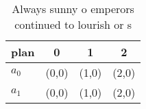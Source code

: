 \documentclass[a4paper]{article}
\begin{document}
\begin{table}
\begin{adjustbox}{width=0.6\columnwidth}
\begin{tabular}{|l|l|l|l|}
\hline
\textbf{plan} & \multicolumn{1}{c|}{\textbf{0}} & \multicolumn{1}{c|}{\textbf{1}} & \multicolumn{1}{c|}{\textbf{2}} \\ \hline
\textbf{$a_0$}  & (0,0) & (1,0) & (2,0) \\ \hline
\textbf{$a_1$}  & (0,0) & (1,0) & (2,0) \\ \hline
\end{tabular}
\end{adjustbox}
\caption{Always sunny o emperors continued to lourish or s
}
\end{table}
\end{document}
